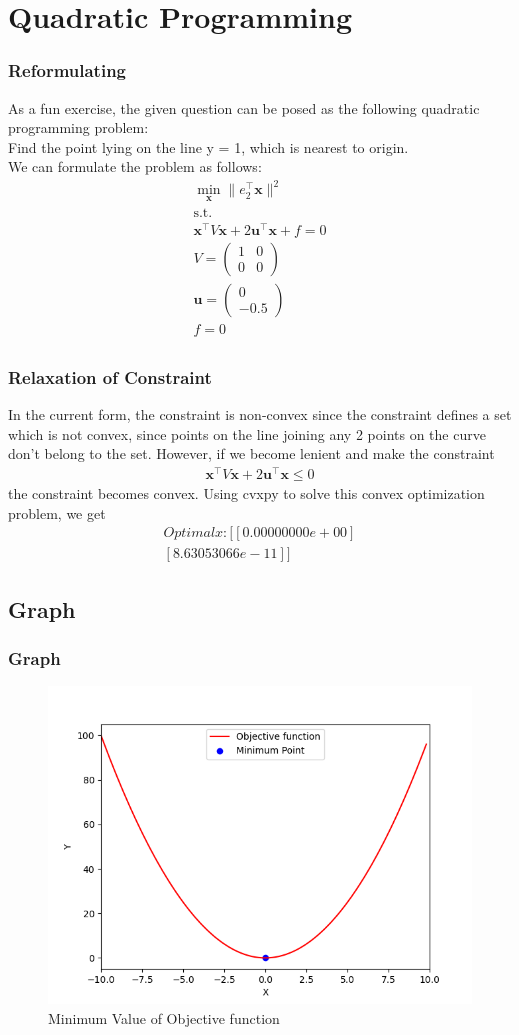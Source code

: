\documentclass{beamer}
\theoremstyle{remark}
\providecommand{\norm}[1]{\lVert#1\rVert}
\newcommand{\myvec}[1]{\ensuremath{\begin{pmatrix}#1\end{pmatrix}}}
\let\vec\mathbf
\numberwithin{equation}{section}
\begin{document}
\section{Quadratic Programming}
\begin{frame}
\frametitle{Reformulating}
As a fun exercise, the given question can be posed as the following quadratic programming problem:\\
Find the point lying on the line y = 1, which is nearest to origin.
\\ We can formulate the problem as follows:
\begin{align}
    \min_{\vec{x}} \norm{e_2^{\top}\vec{x}}^2\\
    \text{s.t. } \\ \vec{x}^{\top}V\vec{x} + 2\vec{u}^{\top}\vec{x} + f = 0\\
    V = \myvec{1 & 0 \\ 0 & 0}\\
    \vec{u} = \myvec{0 \\ -0.5}\\
    f = 0\\
\end{align}
\end{frame}
\begin{frame}
\frametitle{Relaxation of Constraint}

In the current form, the constraint is non-convex since the constraint defines a set which is not convex, since points on the
line joining any 2 points on the curve don't belong to the set. However, if we become lenient and make the constraint
\begin{align}
    \vec{x}^{\top}V\vec{x} + 2\vec{u}^{\top}\vec{x} \le 0
\end{align}
the constraint becomes convex. Using cvxpy to solve this convex optimization problem, we get \\
\begin{align}
    Optimal x: [[0.00000000e+00]\\
 [8.63053066e-11]]
\end{align}
\end{frame}
\subsection{Graph}
\begin{frame}[fragile]
\frametitle{Graph}
\begin{figure}[h!]
   \centering
   \includegraphics[width=0.7\linewidth]{figs/fig.png}
   \caption{Minimum Value of Objective function}
\end{figure}
\end{frame}
\end{document}
